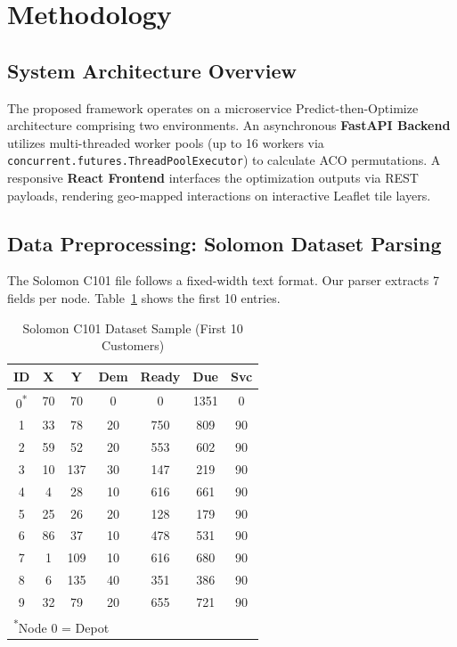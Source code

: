 \documentclass[10pt,conference]{IEEEtran}
\begin{document}
\section{Methodology}

\subsection{System Architecture Overview}
The proposed framework operates on a microservice Predict-then-Optimize architecture comprising two environments. An asynchronous \textbf{FastAPI Backend} utilizes multi-threaded worker pools (up to 16 workers via \texttt{concurrent.futures.ThreadPoolExecutor}) to calculate ACO permutations. A responsive \textbf{React Frontend} interfaces the optimization outputs via REST payloads, rendering geo-mapped interactions on interactive Leaflet tile layers.

\subsection{Data Preprocessing: Solomon Dataset Parsing}
The Solomon C101 file follows a fixed-width text format. Our parser extracts 7 fields per node. Table~\ref{tab:solomon_sample} shows the first 10 entries.

\begin{table}[h]
\caption{Solomon C101 Dataset Sample (First 10 Customers)}
\label{tab:solomon_sample}
\begin{center}
\footnotesize
\begin{tabular}{|c|c|c|c|c|c|c|}
\hline
\textbf{ID} & \textbf{X} & \textbf{Y} & \textbf{Dem} & \textbf{Ready} & \textbf{Due} & \textbf{Svc} \\
\hline
0\textsuperscript{*} & 70 & 70 & 0 & 0 & 1351 & 0 \\
1 & 33 & 78 & 20 & 750 & 809 & 90 \\
2 & 59 & 52 & 20 & 553 & 602 & 90 \\
3 & 10 & 137 & 30 & 147 & 219 & 90 \\
4 & 4 & 28 & 10 & 616 & 661 & 90 \\
5 & 25 & 26 & 20 & 128 & 179 & 90 \\
6 & 86 & 37 & 10 & 478 & 531 & 90 \\
7 & 1 & 109 & 10 & 616 & 680 & 90 \\
8 & 6 & 135 & 40 & 351 & 386 & 90 \\
9 & 32 & 79 & 20 & 655 & 721 & 90 \\
\hline
\multicolumn{7}{l}{\textsuperscript{*}Node 0 = Depot} \\
\end{tabular}
\end{center}
\end{table}
\end{document}
